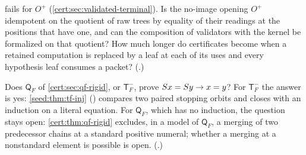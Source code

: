 \begin{question}
 fails for $O^{+}$ (\cref{cert:sec:validated-terminal}).
Is the no-image opening $O^{+}$ idempotent on the quotient of raw trees by
equality of their readings at the positions that have one, and can the
composition of validators with the kernel be formalized on that quotient?
How much longer do certificates become when a retained computation is replaced
by a leaf at each of its uses and every hypothesis leaf consumes a packet?
(.)
\end{question}

\begin{question}
Does $\mathsf Q_F$ of \cref{cert:sec:qf-rigid}, or $\mathsf T_F^{-}$, prove
$S x=S y\to x=y$? For $\mathsf T_F^{-}$ the answer is yes:
\cref{seed:thm:tf-inj} () compares two paired
stopping orbits and closes with an induction on a literal equation.  For
$\mathsf Q_F$, which has no induction, the question stays open:
\cref{cert:thm:qf-rigid} excludes, in a model of $\mathsf Q_F$, a merging of
two predecessor chains at a standard positive numeral; whether a merging at a
nonstandard element is possible is open.  (.)
\end{question}

